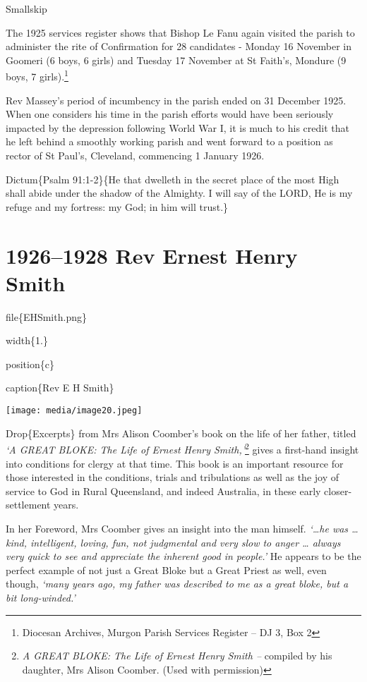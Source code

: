 Smallskip

The 1925 services register shows that Bishop Le Fanu again visited the parish to administer the rite of Confirmation for 28 candidates - Monday 16 November in Goomeri (6 boys, 6 girls) and Tuesday 17 November at St Faith's, Mondure (9 boys, 7 girls).\footnote{Diocesan Archives, Murgon Parish Services Register -- DJ 3, Box 2}

Rev Massey's period of incumbency in the parish ended on 31 December 1925. When one considers his time in the parish efforts would have been seriously impacted by the depression following World War I, it is much to his credit that he left behind a smoothly working parish and went forward to a position as rector of St Paul's, Cleveland, commencing 1 January 1926.

Dictum\{Psalm 91:1-2\}\{He that dwelleth in the secret place of the most High shall abide under the shadow of the Almighty. I will say of the LORD, He is my refuge and my fortress: my God; in him will trust.\}

\hypertarget{rev-ernest-henry-smith}{%
\chapter{1926--1928 Rev Ernest Henry Smith}\label{rev-ernest-henry-smith}}

file\{EHSmith.png\}

width\{1.\}

position\{c\}

caption\{Rev E H Smith\}

\texttt{[image: media/image20.jpeg]}

Drop\{Excerpts\} from Mrs Alison Coomber's book on the life of her father, titled \emph{`A GREAT BLOKE: The Life of Ernest Henry Smith,'}\footnote{\emph{A GREAT BLOKE: The Life of Ernest Henry Smith --} compiled by his daughter, Mrs Alison Coomber. (Used with permission)} gives a first-hand insight into conditions for clergy at that time. This book is an important resource for those interested in the conditions, trials and tribulations as well as the joy of service to God in Rural Queensland, and indeed Australia, in these early closer-settlement years.

In her Foreword, Mrs Coomber gives an insight into the man himself. \emph{`\ldots he was \ldots{} kind, intelligent, loving, fun, not judgmental and very slow to anger \ldots{} always very quick to see and appreciate the inherent good in people.'} He appears to be the perfect example of not just a Great Bloke but a Great Priest as well, even though, \emph{`many years ago, my father was described to me as a great bloke, but a bit long-winded.'}

